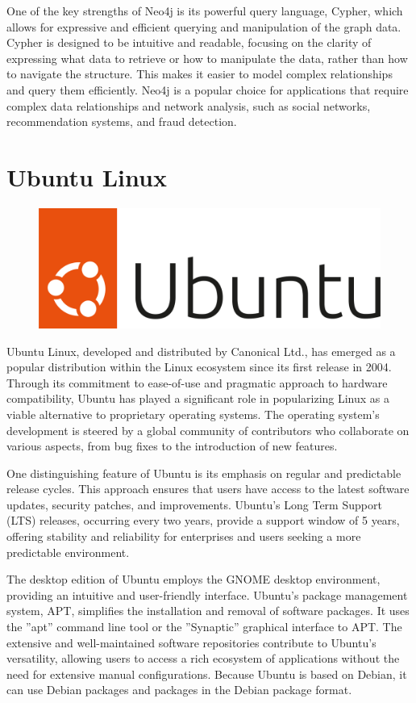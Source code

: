 One of the key strengths of Neo4j is its powerful query language, Cypher, which allows for expressive and efficient querying and manipulation of the graph data. Cypher is designed to be intuitive and readable, focusing on the clarity of expressing what data to retrieve or how to manipulate the data, rather than how to navigate the structure. This makes it easier to model complex relationships and query them efficiently. Neo4j is a popular choice for applications that require complex data relationships and network analysis, such as social networks, recommendation systems, and fraud detection.

\section{Ubuntu Linux}

\begin{figure}
\begin{center}
\includegraphics[height=.5in]{Ubuntu-logo.png}
\end{center}
\end{figure}

Ubuntu Linux, developed and distributed by Canonical Ltd., has emerged as a popular distribution within the Linux ecosystem since its first release in 2004. Through its commitment to ease-of-use and pragmatic approach to hardware compatibility, Ubuntu has played a significant role in popularizing Linux as a viable alternative to proprietary operating systems. The operating system's development is steered by a global community of contributors who collaborate on various aspects, from bug fixes to the introduction of new features.

One distinguishing feature of Ubuntu is its emphasis on regular and predictable release cycles. This approach ensures that users have access to the latest software updates, security patches, and improvements. Ubuntu's Long Term Support (LTS) releases, occurring every two years, provide a support window of 5 years, offering stability and reliability for enterprises and users seeking a more predictable environment.

The desktop edition of Ubuntu employs the GNOME desktop environment, providing an intuitive and user-friendly interface. Ubuntu's package management system, APT, simplifies the installation and removal of software packages. It uses the ''apt'' command line tool or the ''Synaptic'' graphical interface to APT. The extensive and well-maintained software repositories contribute to Ubuntu's versatility, allowing users to access a rich ecosystem of applications without the need for extensive manual configurations. Because Ubuntu is based on Debian, it can use Debian packages and packages in the Debian package format.

